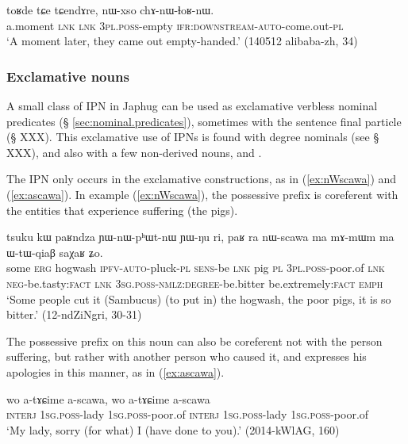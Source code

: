\begin{exe}
\ex \label{ex:nWxso.chAnWlhoRnW}
\gll toʁde tɕe tɕendɤre, nɯ-xso chɤ-nɯ-ɬoʁ-nɯ. \\
a.moment \textsc{lnk} \textsc{lnk} \textsc{3pl.poss}-empty \textsc{ifr}:\textsc{downstream}-\textsc{auto}-come.out-\textsc{pl} \\
\glt `A moment later, they came out empty-handed.' (140512 alibaba-zh, 34)
\end{exe} 

\subsubsection{Exclamative nouns}
A small class of IPN in Japhug can be used as exclamative verbless nominal predicates (§ \ref{sec:nominal.predicates}), sometimes with the sentence final particle  (§ XXX). This exclamative use of IPNs is found with degree nominals (see § XXX), and also with a few non-derived nouns,  and .

The IPN  only occurs in the exclamative constructions, as in (\ref{ex:nWscawa}) and (\ref{ex:ascawa}). In example (\ref{ex:nWscawa}), the possessive prefix is coreferent with the entities that experience suffering (the pigs).

\begin{exe}
\ex \label{ex:nWscawa} 
\gll tsuku kɯ paʁndza ɲɯ-nɯ-pʰɯt-nɯ ɲɯ-ŋu ri, paʁ ra nɯ-scawa ma mɤ-mɯm ma ɯ-tɯ-qiaβ saχaʁ ʑo. \\
some \textsc{erg} hogwash \textsc{ipfv}-\textsc{auto}-pluck-\textsc{pl} \textsc{sens}-be \textsc{lnk} pig \textsc{pl} \textsc{3pl}.\textsc{poss}-poor.of \textsc{lnk} \textsc{neg}-be.tasty:\textsc{fact} \textsc{lnk} \textsc{3sg}.\textsc{poss}-\textsc{nmlz}:\textsc{degree}-be.bitter be.extremely:\textsc{fact} \textsc{emph} \\
\glt `Some people cut it (Sambucus) (to put in) the hogwash, the poor pigs, it is so bitter.' (12-ndZiNgri, 30-31)
\end{exe}

The possessive prefix on this noun can also be coreferent not with the person suffering, but rather with another person who caused it, and expresses his apologies in this manner, as in (\ref{ex:ascawa}).

\begin{exe}
\ex \label{ex:ascawa}
\gll wo a-tɤɕime a-scawa, wo a-tɤɕime a-scawa \\
\textsc{interj} \textsc{1sg}.\textsc{poss}-lady \textsc{1sg}.\textsc{poss}-poor.of \textsc{interj} \textsc{1sg}.\textsc{poss}-lady \textsc{1sg}.\textsc{poss}-poor.of  \\ 
\glt `My lady, sorry (for what) I (have done to you).' (2014-kWlAG, 160)
\end{exe}

